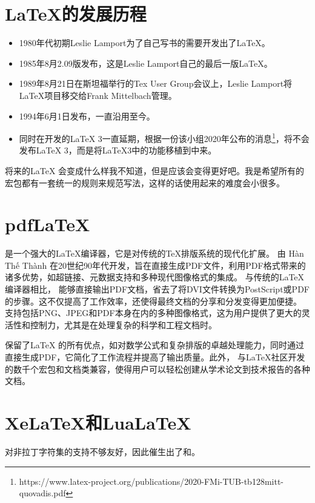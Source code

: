 \section{\LaTeX 的发展历程}
\begin{itemize}
	\item 1980年代初期Leslie Lamport为了自己写书的需要开发出了\LaTeX。
	\item 1985年8月2.09版发布，这是Leslie Lamport自己的最后一版\LaTeX。
	\item 1989年8月21日在斯坦福举行的Tex User Group会议上，Leslie Lamport将\LaTeX 项目移交给Frank Mittelbach管理。
	\item 1994年6月1日发布\LaTeXe，一直沿用至今。
	\item 同时在开发的\LaTeX
	      3一直延期，根据一份该小组2020年公布的消息\footnote{https://www.latex-project.org/publications/2020-FMi-TUB-tb128mitt-quovadis.pdf}，将不会发布\LaTeX
	      3，而是将\LaTeX 3中的功能移植到\LaTeXe 中来。
\end{itemize}

将来的\LaTeX
会变成什么样我不知道，但是应该会变得更好吧。我是希望所有的宏包都有一套统一的规则来规范写法，这样的话使用起来的难度会小很多。

\section{pdfLaTeX}
 是一个强大的\LaTeX 编译器，它是对传统的\TeX 排版系统的现代化扩展。 由 Hàn Thế Thành 在20世纪90年代开发，旨在直接生成PDF文件，利用PDF格式带来的诸多优势，如超链接、元数据支持和多种现代图像格式的集成。
与传统的\LaTeX 编译器相比，
能够直接输出PDF文档，省去了将DVI文件转换为PostScript或PDF的步骤。这不仅提高了工作效率，还使得最终文档的分享和分发变得更加便捷。 支持包括PNG、JPEG和PDF本身在内的多种图像格式，这为用户提供了更大的灵活性和控制力，尤其是在处理复杂的科学和工程文档时。

 保留了\LaTeX
的所有优点，如对数学公式和复杂排版的卓越处理能力，同时通过直接生成PDF，它简化了工作流程并提高了输出质量。此外， 与\LaTeX 社区开发的数千个宏包和文档类兼容，使得用户可以轻松创建从学术论文到技术报告的各种文档。

\section{XeLaTeX和LuaLaTeX}
对非拉丁字符集的支持不够友好，因此催生出了和。

